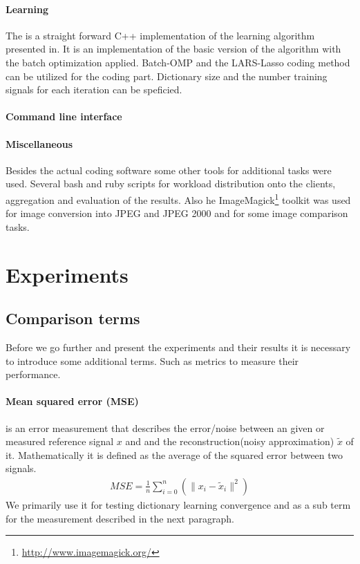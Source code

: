 \paragraph{Learning}
The \trainDL is a straight forward C++ implementation of the
learning algorithm presented in\cite{Mairal2010}. It is an implementation of the
basic version of the algorithm with the batch optimization applied. Batch-OMP
and the LARS-Lasso coding method can be utilized for the coding part.
Dictionary size and the number training signals for each iteration can be
speficied.


\paragraph{Command line interface}
%

\paragraph{Miscellaneous}
Besides the actual coding software some other tools for
additional tasks were used. Several bash and ruby scripts for workload
distribution onto the clients, aggregation and evaluation of the results.
Also he ImageMagick\footnote{\url{http://www.imagemagick.org/}} toolkit was used
for image conversion into JPEG and JPEG 2000 and for some image comparison
tasks.


\section{Experiments}

\subsection{Comparison terms}
Before we go further and present the experiments and their results  it is
necessary to introduce some additional terms. Such as metrics to measure
their performance.

\paragraph{Mean squared error (MSE)} is an error measurement that
describes the error/noise between an given or measured reference signal $x$
and  and the reconstruction(noisy approximation) $\tilde{x}$ of it.
Mathematically it is defined as the average of the squared error between two
signals.
\begin{align}
 MSE = \frac{1}{n} \sum_{i=0}^{n} \left( {\lVert x_i -
\tilde{x}_i\rVert^{2}}\right)
\end{align}
We primarily use it for testing dictionary learning convergence and as a
sub term for the measurement described in the next paragraph.

